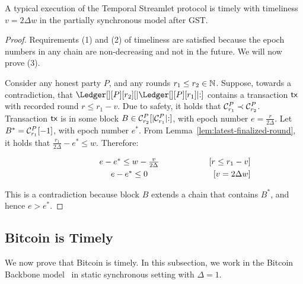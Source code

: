 \begin{theorem}
  A typical execution of the Temporal Streamlet protocol is timely
  with timeliness $v = 2\Delta w$ in the partially synchronous model after GST.
\end{theorem}
\begin{proof}
  Requirements (1) and (2) of timeliness are satisfied because the epoch numbers in any chain
  are non-decreasing and not in the future.
  We will now prove (3).

  Consider any honest party $P$, and any rounds $r_1 \leq r_2 \in \mathbb{N}$.
  Suppose, towards a contradiction, that $\Ledger[][P][r_2][|\Ledger[][P][r_1]|{:}]$
  contains a transaction $\textsf{tx}$ with recorded round $r \leq r_1 - v$.
  Due to safety, it holds that $\mathcal{C}^P_{r_1} \prec \mathcal{C}^P_{r_2}$.
  Transaction $\textsf{tx}$ is in some block $B \in \mathcal{C}^P_{r_2}[|\mathcal{C}^P_{r_1}|{:}]$,
  with epoch number $e = \frac{r}{2\Delta}$.
  Let $B^* = \mathcal{C}^P_{r_1}[-1]$, with epoch number $e^*$.
  From Lemma~\ref{lem:latest-finalized-round}, it holds that
  $\frac{r_1}{2\Delta} - e^* \leq w$. Therefore:

  \begin{align*}
    \makebox[0.5\textwidth][c]{$e - e^* \leq w - \frac{v}{2\Delta}$}         && \text{[$r \leq r_1 - v$]} \\
    \makebox[0.5\textwidth][c]{$e - e^* \leq 0$}                                 && \text{[$v = 2\Delta w$]}
  \end{align*}

  This is a contradiction because block $B$ extends a chain that contains $B^*$,
  and hence $e > e^*$.

  \Qed
\end{proof}










\subsection{Bitcoin is Timely}

We now prove that Bitcoin is timely. In this subsection, we work in the Bitcoin Backbone model~\cite{backbone}
in static synchronous setting with $\Delta = 1$.

